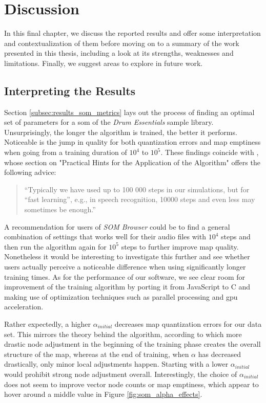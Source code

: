 
\section{Discussion}
\label{sec:discussion}
In this final chapter, we discuss the reported results and offer some
interpretation and contextualization of them before moving on to a summary of
the work presented in this thesis, including a look at its strengths, weaknesses
and limitations. Finally, we suggest areas to explore in future work.

\subsection{Interpreting the Results}
\label{subsec:discussion_results_interpretation}

Section \ref{subsec:results_som_metrics} lays out the process of finding an
optimal set of parameters for a \gls{som} of the \textit{Drum Essentials} sample
library. Unsurprisingly, the longer the algorithm is trained, the better it
performs. Noticeable is the jump in quality for both quantization errors and
map emptiness when going from a training duration of $10^4$ to $10^5$. These
findings coincide with \citet{kohonen1990}, whose section on "Practical Hints
for the Application of the Algorithm" offers the following advice:

\begin{quotation}
“Typically we have used up to 100 000 steps in our simulations, but for
“fast learning”, e.g., in speech recognition, 10000 steps and even less may
sometimes be enough.”
\end{quotation}

A recommendation for users of \textit{SOM Browser} could be to find a general
combination of settings that works well for their audio files with $10^4$ steps
and then run the algorithm again for $10^5$ steps to further improve map
quality. Nonetheless it would be interesting to investigate this further and
see whether users actually perceive a noticeable difference when using
significantly longer training times. As for the performance of our software, we
see clear room for improvement of the training algorithm by porting it from
JavaScript to C and making use of optimization techniques such as parallel
processing and \gls{gpu} acceleration.

\smallskip

Rather expectedly, a higher $\alpha_{initial}$ decreases map quantization errors
for our data set. This mirrors the theory behind the algorithm, according to
which more drastic node adjustment in the beginning of the training phase
creates the overall structure of the map, whereas at the end of training, when
$\alpha$ has decreased drastically, only minor local adjustments happen.
Starting with a lower $\alpha_{initial}$ would prohibit strong node adjustment
overall. Interestingly, the choice of $\alpha_{initial}$ does not seem to
improve vector node counts or map emptiness, which appear to hover around a
middle value in Figure \ref{fig:som_alpha_effects}.

